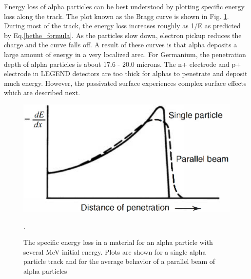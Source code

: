 Energy loss of alpha particles can be best understood by plotting specific energy loss along the track. The plot known as the Bragg curve is shown in Fig. \ref{bragg_curve_fig}. During most of the track, the energy loss increases roughly as 1/E as predicted by Eq.\ref{bethe_formula}. As the particles slow down, electron pickup reduces the charge and the curve falls off. A result of these curves is that alpha deposits a large amount of energy in a very localized area. For Germanium, the penetration depth of alpha particles is about $17.6$ - $20.0$ microns. The n+ electrode and p+ electrode in LEGEND detectors are too thick for alphas to penetrate and deposit much energy. However, the passivated surface experiences complex surface effects which are described next.

\begin{figure}
\centering
\includegraphics[width=0.5\linewidth]{ch3/figs/bragg_curve.png}
\caption{The specific energy loss in a material for an alpha particle with several MeV initial energy. Plots are shown for a single alpha particle track and for the average behavior of a parallel beam of alpha particles \cite{knoll_2010}}. 
\label{bragg_curve_fig}
\end{figure}



  
